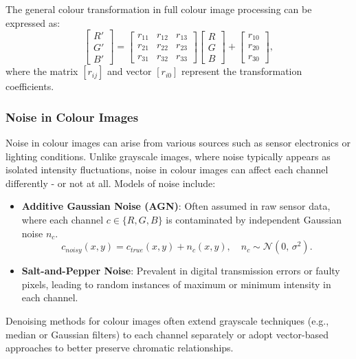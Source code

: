 \documentclass[a4paper,12pt]{article}
\begin{document}
The general colour transformation in full colour image processing can be expressed as:
\[
\begin{bmatrix}
R' \\
G' \\
B'
\end{bmatrix}
=
\begin{bmatrix}
r_{11} & r_{12} & r_{13} \\
r_{21} & r_{22} & r_{23} \\
r_{31} & r_{32} & r_{33}
\end{bmatrix}
\begin{bmatrix}
R \\
G \\
B
\end{bmatrix}
+
\begin{bmatrix}
r_{10} \\
r_{20} \\
r_{30}
\end{bmatrix},
\]
where the matrix \([r_{ij}]\) and vector \([r_{i0}]\) represent the transformation coefficients.

\subsubsection{Noise in Colour Images}

Noise in colour images can arise from various sources such as sensor electronics or lighting conditions. Unlike grayscale images, where noise typically appears as isolated intensity fluctuations, noise in colour images can affect each channel differently - or not at all. Models of noise include:

\begin{itemize}
    \item \textbf{Additive Gaussian Noise (AGN)}: Often assumed in raw sensor data, where each channel \(c \in \{R, G, B\}\) is contaminated by independent Gaussian noise \(n_c\).
    \[
    c_{noisy}(x,y) = c_{true}(x,y) + n_c(x,y), \quad n_c \sim \mathcal{N}(0,\,\sigma^2).
    \]
    \item \textbf{Salt-and-Pepper Noise}: Prevalent in digital transmission errors or faulty pixels, leading to random instances of maximum or minimum intensity in each channel.
\end{itemize}

Denoising methods for colour images often extend grayscale techniques (e.g., median or Gaussian filters) to each channel separately or adopt vector-based approaches to better preserve chromatic relationships.
\end{document}
